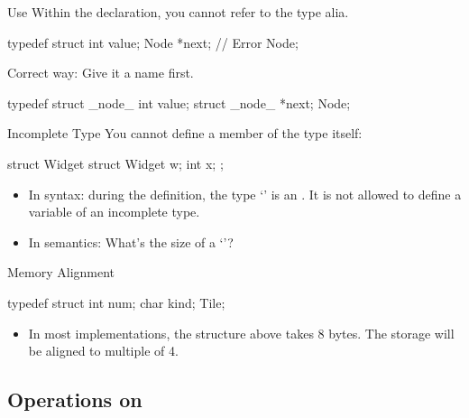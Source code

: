 \documentclass{beamer}
\begin{document}
\begin{frame}[fragile]{Use }
    Within the  declaration, you cannot refer to the type alia.
    \begin{cpp}
typedef struct {
  int value;
  Node *next;   // Error
} Node;
    \end{cpp}
    \pause
    Correct way: Give it a name first.
    \begin{cpp}
typedef struct _node_ {
  int value;
  struct _node_ *next;
} Node;
    \end{cpp}
\end{frame}

\begin{frame}[fragile]{Incomplete Type}
    You cannot define a member of the type itself:
    \begin{cpp}
struct Widget {
  struct Widget w;
  int x;
};
    \end{cpp}
    \begin{itemize}
        \item In syntax: during the definition, the type `' is an . It is not allowed to define a variable of an incomplete type.
        \item In semantics: What's the size of a `'?
    \end{itemize}
\end{frame}

\begin{frame}[fragile]{Memory Alignment}
    \begin{cpp}
typedef struct {
  int num;
  char kind;
} Tile;
    \end{cpp}
    \begin{itemize}
        \item In most implementations, the structure above takes 8 bytes. The storage will be aligned to multiple of 4.
    \end{itemize}
\end{frame}

\subsection{Operations on }
\end{document}
